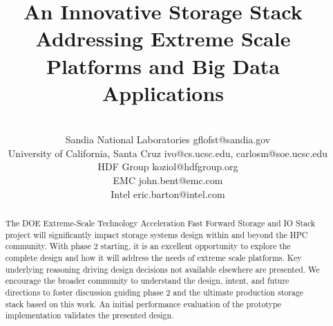 \documentclass{sig-alt-gov2}
\begin{document}

\title{An Innovative Storage Stack Addressing Extreme Scale Platforms and Big Data Applications}

\author{
\\
\footnotemark[1]~~Sandia National Laboratories gflofst@sandia.gov\\
\footnotemark[2]~~University of California, Santa Cruz ivo@cs.ucsc.edu, carlosm@soe.ucsc.edu\\
\footnotemark[3]~~HDF Group koziol@hdfgroup.org\\
\footnotemark[4]~~EMC john.bent@emc.com\\
\footnotemark[5]~~Intel eric.barton@intel.com
}
\maketitle

\begin{abstract}
The DOE Extreme-Scale Technology Acceleration Fast Forward Storage and IO Stack
project will significantly impact storage systems design within and beyond the
HPC community. With phase 2 starting, it is an excellent opportunity to explore
the complete design and how it will address the needs of extreme scale
platforms.
Key underlying reasoning driving design
decisions not available elsewhere are presented.  We encourage the broader
community to understand the design, intent, and future directions to foster
discussion guiding phase 2 and the ultimate production storage stack based on
this work.  An initial performance evaluation of the prototype implementation
validates the presented design.

\end{abstract}

\end{document}
